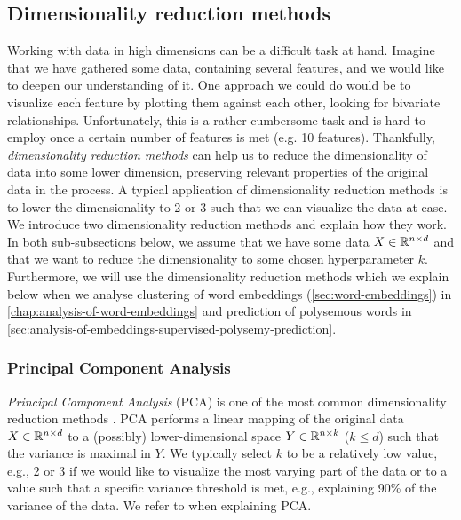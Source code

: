 \subsection{Dimensionality reduction methods}
\label{sec:dimensionality-reduction-methods}
Working with data in high dimensions can be a difficult task at hand. Imagine that we have gathered some data, containing several features, and we would like to deepen our understanding of it. One approach we could do would be to visualize each feature by plotting them against each other, looking for bivariate relationships. Unfortunately, this is a rather cumbersome task and is hard to employ once a certain number of features is met (e.g. 10 features). Thankfully, \textit{dimensionality reduction methods} can help us to reduce the dimensionality of data into some lower dimension, preserving relevant properties of the original data in the process. A typical application of dimensionality reduction methods is to lower the dimensionality to 2 or 3 such that we can visualize the data at ease. We introduce two dimensionality reduction methods and explain how they work. In both sub-subsections below, we assume that we have some data $X \in \mathbb{R}^{n \times d}$ and that we want to reduce the dimensionality to some chosen hyperparameter $k$. Furthermore, we will use the dimensionality reduction methods which we explain below when we analyse clustering of word embeddings (\cref{sec:word-embeddings}) in \cref{chap:analysis-of-word-embeddings} and prediction of polysemous words in \cref{sec:analysis-of-embeddings-supervised-polysemy-prediction}.

\subsubsection{Principal Component Analysis}
\label{sec:pca}
\textit{Principal Component Analysis} (PCA) is one of the most common dimensionality reduction methods \cite{Jolliffe2002}. PCA performs a linear mapping of the original data $X \in \mathbb{R}^{n \times d}$ to a (possibly) lower-dimensional space $Y \in \mathbb{R}^{n \times k}$ ($k \leq d$) such that the variance is maximal in $Y$. We typically select $k$ to be a relatively low value, e.g., 2 or 3 if we would like to visualize the most varying part of the data or to a value such that a specific variance threshold is met, e.g., explaining 90\% of the variance of the data. We refer to \cite{Jolliffe2002} when explaining PCA.

